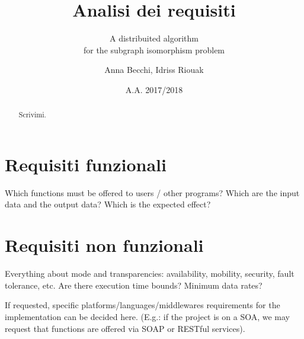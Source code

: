 \documentclass{llncs}
\subtitle{A distribuited algorithm\\for the subgraph isomorphism problem}
\title{Analisi dei requisiti}
\author{Anna Becchi, Idriss Riouak}
\institute{Laurea Magistrale in Informatica\\Universit\`a di Udine, Italy}
\date{A.A. 2017/2018}
\begin{document}
\maketitle
\begin{abstract}
  Scrivimi.
\end{abstract}


\section{Requisiti funzionali}
\label{sec:func-req}
Which functions must be offered to users / other programs?
Which are the input data and the output data?
Which is the expected effect?


\section{Requisiti non funzionali}
\label{sec:nonfunc-req}
Everything about mode and transparencies:
availability, mobility, security, fault tolerance, etc.
Are there execution time bounds? Minimum data rates?

If requested, specific platforms/languages/middlewares requirements
for the implementation can be decided here.
(E.g.: if the project is on a SOA, we may request that functions
are offered via SOAP or RESTful services).


\end{document}
